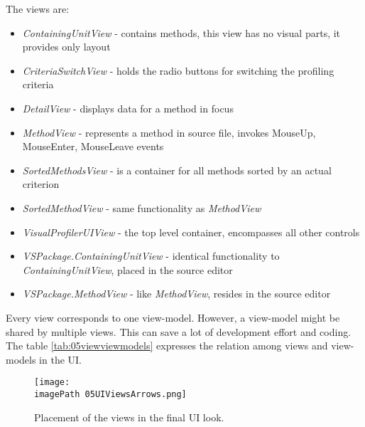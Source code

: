 The views are:
\begin{itemize}	
\item  \textit{ContainingUnitView} - contains methods, this view has no visual parts, it provides only layout 

\item \textit{CriteriaSwitchView} - holds the radio buttons for switching the profiling criteria

\item \textit{DetailView} - displays data for a method in focus

\item \textit{MethodView} - represents a method in source file, invokes MouseUp, MouseEnter, MouseLeave events

\item \textit{SortedMethodsView} - is a container for all methods sorted by an actual criterion

\item \textit{SortedMethodView} - same functionality as \textit{MethodView}

\item \textit{VisualProfilerUIView} - the top level container, encompasses all other controls

\item \textit{VSPackage.ContainingUnitView} - identical functionality to \textit{ContainingUnitView}, placed in the source editor 

\item \textit{VSPackage.MethodView} - like \textit{MethodView}, resides in the source editor

\end{itemize}

Every view corresponds to one view-model. However, a view-model might be shared by multiple views. This can save a lot of development effort and coding. The table \ref{tab:05viewviewmodels} expresses the relation among views and view-models in the UI.

\begin{figure}
	\centering
		\texttt{[image: \\imagePath 05UIViewsArrows.png]}
		\caption{Placement of the views in the final UI look.}
	\label{fig:05UIViewsArrows}
\end{figure}

